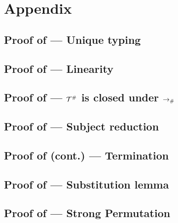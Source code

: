 \chapter{Appendix}

\section{Proof of  --- Unique typing}
\label{unique_typing_proof}


\section{Proof of  --- Linearity}
\label{linearity_proof}


\section{Proof of  --- $\mathcal{T}^{\mathtt{\#}}$ is closed under $\mathrel{\to_{\mathtt{\#}}}$}
\label{closed_under_arrow_proof}


\section{Proof of  --- Subject reduction}
\label{subject_reduction_proof}


\section{Proof of  (cont.) --- Termination}
\label{termination_proof}


\section{Proof of  --- Substitution lemma}
\label{substitution_lemma_proof}


\section{Proof of  --- Strong Permutation}
\label{strong_permutation_proof}


